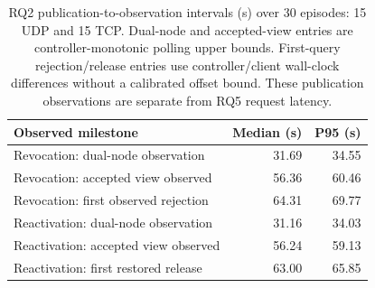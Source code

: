 \begin{table}[t]
\centering\small
\setlength{\tabcolsep}{3.5pt}
\caption{RQ2 publication-to-observation intervals (s) over 30 episodes: 15 UDP and 15 TCP. Dual-node and accepted-view entries are controller-monotonic polling upper bounds. First-query rejection/release entries use controller/client wall-clock differences without a calibrated offset bound. These publication observations are separate from RQ5 request latency.}
\label{tab:revocation}
\begin{tabularx}{\textwidth}{@{}Xr r@{}}
\toprule
Observed milestone & Median (s) & P95 (s) \\
\midrule
Revocation: dual-node observation & 31.69 & 34.55 \\
Revocation: accepted view observed & 56.36 & 60.46 \\
Revocation: first observed rejection & 64.31 & 69.77 \\
Reactivation: dual-node observation & 31.16 & 34.03 \\
Reactivation: accepted view observed & 56.24 & 59.13 \\
Reactivation: first restored release & 63.00 & 65.85 \\
\bottomrule
\end{tabularx}
\end{table}
